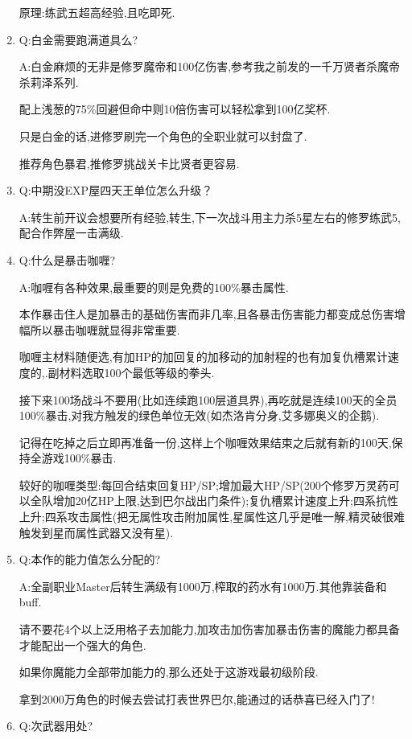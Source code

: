\begin{enumerate}
	原理:练武五超高经验,且吃即死.

	\item 
	Q:白金需要跑满道具么?

	A:白金麻烦的无非是修罗魔帝和100亿伤害,参考我之前发的一千万贤者杀魔帝杀莉泽系列.

	配上浅葱的75\%回避但命中则10倍伤害可以轻松拿到100亿奖杯.

	只是白金的话,进修罗刷完一个角色的全职业就可以封盘了.

	推荐角色暴君,推修罗挑战关卡比贤者更容易.

	\item
	Q:中期没EXP屋四天王单位怎么升级？

	A:转生前开议会想要所有经验,转生,下一次战斗用主力杀5星左右的修罗练武5,配合作弊屋一击满级.

	\item
	Q:什么是暴击咖喱?
	
	A:咖喱有各种效果,最重要的则是免费的100\%暴击属性.

	本作暴击住人是加暴击的基础伤害而非几率,且各暴击伤害能力都变成总伤害增幅所以暴击咖喱就显得非常重要.

	咖喱主材料随便选,有加HP的加回复的加移动的加射程的也有加复仇槽累计速度的,{\color{red}{也有开局自带异常状态的}}.副材料选取100个最低等级的拳头.

	接下来100场战斗不要用(比如连续跑100层道具界),再吃就是连续100天的全员100\%暴击,对我方触发的绿色单位无效(如杰洛肯分身,艾多娜奥义的企鹅).

	记得在吃掉之后立即再准备一份,这样上个咖喱效果结束之后就有新的100天,保持全游戏100\%暴击.

	较好的咖喱类型:每回合结束回复HP/SP;增加最大HP/SP(200个修罗万灵药可以全队增加20亿HP上限,达到巴尔战出门条件);复仇槽累计速度上升;四系抗性上升;四系攻击属性(把无属性攻击附加属性,星属性这几乎是唯一解,精灵破很难触发到星而属性武器又没有星).

	\item
	Q:本作的能力值怎么分配的?

	A:全副职业Master后转生满级有1000万,榨取的药水有1000万.其他靠装备和buff.

	请不要花4个以上泛用格子去加能力,加攻击加伤害加暴击伤害的魔能力都具备才能配出一个强大的角色.

	如果你魔能力全部带加能力的,那么还处于这游戏最初级阶段.

	拿到2000万角色的时候去尝试打表世界巴尔,能通过的话恭喜已经入门了!

	\item
	Q:次武器用处?


\end{enumerate}
